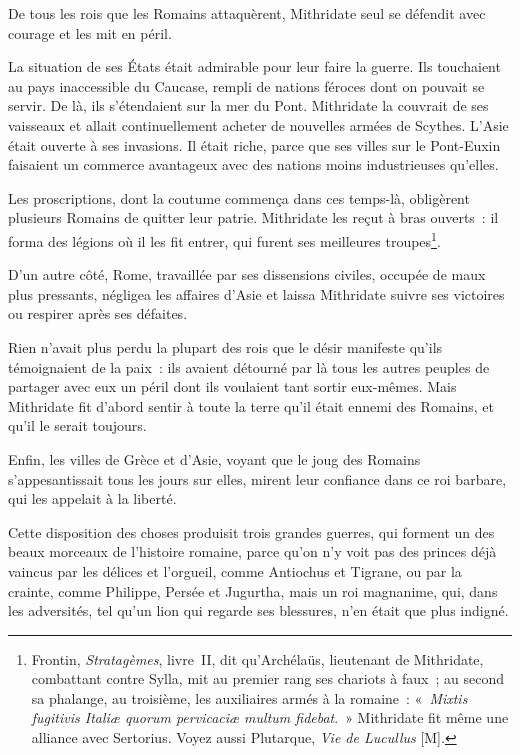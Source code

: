 \documentclass[french,twoside]{book} %
\newcommand\chaptercont{} %
\begin{document}
\chaptercont
\noindent De tous les rois que les Romains attaquèrent, Mithridate seul se défendit avec courage et les mit en péril.\par
La situation de ses États était admirable pour leur faire la guerre. Ils touchaient au pays inaccessible du Caucase, rempli de nations féroces dont on pouvait se servir. De là, ils s’étendaient sur la mer du Pont. Mithridate la couvrait de ses vaisseaux et allait continuellement acheter de nouvelles armées de Scythes. L’Asie était ouverte à ses invasions. Il était riche, parce que ses villes sur le Pont-Euxin faisaient un commerce avantageux avec des nations moins industrieuses qu’elles.\par
Les proscriptions, dont la coutume commença dans ces temps-là, obligèrent plusieurs Romains de quitter leur patrie. Mithridate les reçut à bras ouverts : il forma des légions où il les fit entrer, qui furent ses meilleures troupes\footnote{Frontin, {\itshape Stratagèmes}, livre II, dit qu’Archélaüs, lieutenant de Mithridate, combattant contre Sylla, mit au premier rang ses chariots à faux ; au second sa phalange, au troisième, les auxiliaires armés à la romaine : « {\itshape Mixtis fugitivis Italiæ quorum pervicaciæ multum fidebat}. » Mithridate fit même une alliance avec Sertorius. Voyez aussi Plutarque, {\itshape Vie de Lucullus} [M].}.\par
D’un autre côté, Rome, travaillée par ses dissensions civiles, occupée de maux plus pressants, négligea les affaires d’Asie et laissa Mithridate suivre ses victoires ou respirer après ses défaites.\par
Rien n’avait plus perdu la plupart des rois que le désir manifeste qu’ils témoignaient de la paix : ils avaient détourné par là tous les autres peuples de partager avec eux un péril dont ils voulaient tant sortir eux-mêmes. Mais Mithridate fit d’abord sentir à toute la terre qu’il était ennemi des Romains, et qu’il le serait toujours.\par
Enfin, les villes de Grèce et d’Asie, voyant que le joug des Romains s’appesantissait tous les jours sur elles, mirent leur confiance dans ce roi barbare, qui les appelait à la liberté.\par
Cette disposition des choses produisit trois grandes guerres, qui forment un des beaux morceaux de l’histoire romaine, parce qu’on n’y voit pas des princes déjà vaincus par les délices et l’orgueil, comme Antiochus et Tigrane, ou par la crainte, comme Philippe, Persée et Jugurtha, mais un roi magnanime, qui, dans les adversités, tel qu’un lion qui regarde ses blessures, n’en était que plus indigné.\par
\end{document}
